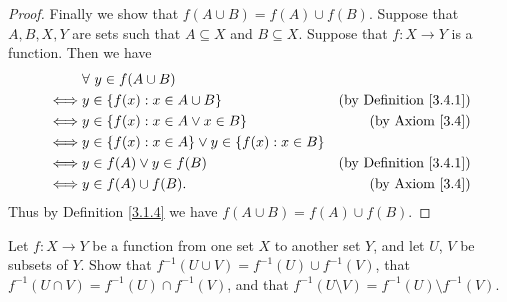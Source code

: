 \begin{proof}
Finally we show that \(f(A \cup B) = f(A) \cup f(B)\).
Suppose that \(A, B, X, Y\) are sets such that \(A \subseteq X\) and \(B \subseteq X\).
Suppose that \(f : X \to Y\) is a function.
Then we have
\begin{align*}
& \forall\ y \in f(A \cup B) \\
\iff & y \in \{f(x) : x \in A \cup B\} & \text{(by Definition \ref{3.4.1})} \\
\iff & y \in \{f(x) : x \in A \lor x \in B\} & \text{(by Axiom \ref{3.4})} \\
\iff & y \in \{f(x) : x \in A\} \lor y \in \{f(x) : x \in B\} \\
\iff & y \in f(A) \lor y \in f(B) & \text{(by Definition \ref{3.4.1})} \\
\iff & y \in f(A) \cup f(B). & \text{(by Axiom \ref{3.4})}
\end{align*}
Thus by Definition \ref{3.1.4} we have \(f(A \cup B) = f(A) \cup f(B)\).
\end{proof}

\begin{exercise}\label{ex 3.4.4}
Let \(f : X \to Y\) be a function from one set \(X\) to another set \(Y\), and let \(U\), \(V\) be subsets of \(Y\). Show that \(f^{-1}(U \cup V) = f^{-1}(U) \cup f^{-1}(V)\), that
\(f^{-1}(U \cap V) = f^{-1}(U) \cap f^{-1}(V)\), and that \(f^{-1}(U \setminus V) = f^{-1}(U) \setminus f^{-1}(V)\).
\end{exercise}

